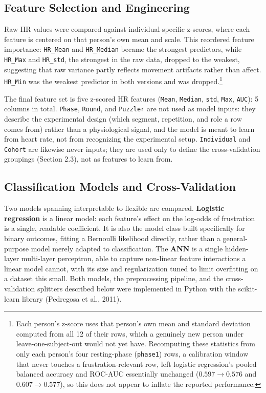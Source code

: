 \documentclass[11pt,a4paper]{article}
\begin{document}
\subsection{Feature Selection and Engineering}

Raw HR values were compared against individual-specific z-scores, where each feature is centered on that person's own mean and scale. This reordered feature importance: \texttt{HR\_Mean} and \texttt{HR\_Median} became the strongest predictors, while \texttt{HR\_Max} and \texttt{HR\_std}, the strongest in the raw data, dropped to the weakest, suggesting that raw variance partly reflects movement artifacts rather than affect. \texttt{HR\_Min} was the weakest predictor in both versions and was dropped.\footnote{Each person's z-score uses that person's own mean and standard deviation computed from all 12 of their rows, which a genuinely new person under leave-one-subject-out would not yet have. Recomputing these statistics from only each person's four resting-phase (\texttt{phase1}) rows, a calibration window that never touches a frustration-relevant row, left logistic regression's pooled balanced accuracy and ROC-AUC essentially unchanged ($0.597\to0.576$ and $0.607\to0.577$), so this does not appear to inflate the reported performance.}

The final feature set is five z-scored HR features (\texttt{Mean}, \texttt{Median}, \texttt{std}, \texttt{Max}, \texttt{AUC}): 5 columns in total. \texttt{Phase}, \texttt{Round}, and \texttt{Puzzler} are not used as model inputs: they describe the experimental design (which segment, repetition, and role a row comes from) rather than a physiological signal, and the model is meant to learn from heart rate, not from recognizing the experimental setup. \texttt{Individual} and \texttt{Cohort} are likewise never inputs; they are used only to define the cross-validation groupings (Section 2.3), not as features to learn from.

\subsection{Classification Models and Cross-Validation}

Two models spanning interpretable to flexible are compared. \textbf{Logistic regression} is a linear model: each feature's effect on the log-odds of frustration is a single, readable coefficient. It is also the model class built specifically for binary outcomes, fitting a Bernoulli likelihood directly, rather than a general-purpose model merely adapted to classification. The \textbf{ANN} is a single hidden-layer multi-layer perceptron, able to capture non-linear feature interactions a linear model cannot, with its size and regularization tuned to limit overfitting on a dataset this small. Both models, the preprocessing pipeline, and the cross-validation splitters described below were implemented in Python with the scikit-learn library (Pedregosa et al., 2011).
\end{document}
